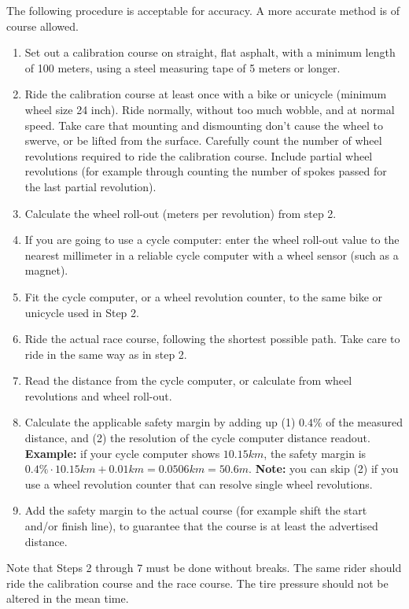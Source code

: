 The following procedure is acceptable for accuracy.
A more accurate method is of course allowed.
\begin{enumerate}
\item Set out a calibration course on straight, flat asphalt, with a minimum length of 100 meters, using a steel measuring tape of 5 meters or longer.
\item Ride the calibration course at least once with a bike or unicycle (minimum wheel size 24 inch).
Ride normally, without too much wobble, and at normal speed.
Take care that mounting and dismounting don't cause the wheel to swerve, or be lifted from the surface.
Carefully count the number of wheel revolutions required to ride the calibration course.
Include partial wheel revolutions (for example through counting the number of spokes passed for the last partial revolution).
\item Calculate the wheel roll-out (meters per revolution) from step 2.
\item If you are going to use a cycle computer: enter the wheel roll-out value to the nearest millimeter in a reliable cycle computer with a wheel sensor (such as a magnet).
\item Fit the cycle computer, or a wheel revolution counter, to the same bike or unicycle used in Step 2.
\item Ride the actual race course, following the shortest possible path.
Take care to ride in the same way as in step 2.
\item Read the distance from the cycle computer, or calculate from wheel revolutions and wheel roll-out.
\item Calculate the applicable safety margin by adding up (1) $0.4\%$ of the measured distance, and (2) the resolution of the cycle computer distance readout.
\textbf{Example:} if your cycle computer shows $10.15\unit{km}$, the safety margin is $0.4\% \cdot 10.15\unit{km} + 0.01\unit{km} = 0.0506\unit{km} = 50.6\unit{m}$.
\textbf{Note:} you can skip (2) if you use a wheel revolution counter that can resolve single wheel revolutions.
\item Add the safety margin to the actual course (for example shift the start and/or finish line), to guarantee that the course is at least the advertised distance.
\end{enumerate}
Note that Steps 2 through 7 must be done without breaks.
The same rider should ride the calibration course and the race course.
The tire pressure should not be altered in the mean time.

